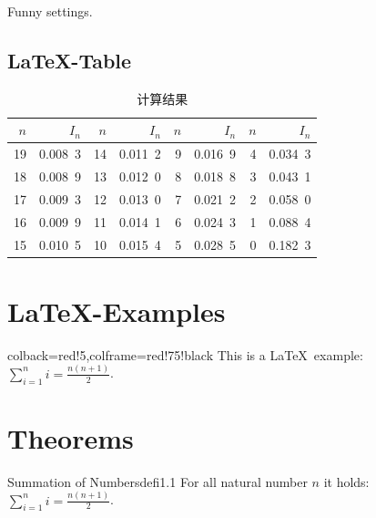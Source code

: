 \begin{tcolorbox}[colback=blue!50,colframe=blue!25!black,coltext=yellow,
    fontupper=\Large\bfseries,arc=6mm,boxrule=2mm,boxsep=5mm]
  Funny settings.
\end{tcolorbox}

\subsection{\LaTeX-Table}

\begin{table}[h]\begin{center}\color{darkblue}\caption{计算结果}\color{black}\label{tab1-2}
{\footnotesize
\begin{tabular}{r|r||r|r||r|r||r|r}\arrayrulecolor{darkblue}\hline\rowcolor{lightblue}
  $n$&$I_n$&$n$&$I_n$&$n$&$I_n$&$n$&$I_n$\\\hline
  19&0.008\ 3&14&0.011\ 2&9&0.016\ 9&4&0.034\ 3\\
  18&0.008\ 9&13&0.012\ 0&8&0.018\ 8&3&0.043\ 1\\
  17&0.009\ 3&12&0.013\ 0&7&0.021\ 2&2&0.058\ 0\\
  16&0.009\ 9&11&0.014\ 1&6&0.024\ 3&1&0.088\ 4\\
  15&0.010\ 5&10&0.015\ 4&5&0.028\ 5&0&0.182\ 3\\\hline
 \end{tabular}}\end{center}\end{table}


\section{\LaTeX-Examples}

\begin{tcblisting}{colback=red!5,colframe=red!75!black}
This is a \LaTeX\ example:
$\displaystyle\sum\limits_{i=1}^n i = \frac{n(n+1)}{2}$.
\end{tcblisting}


\section{Theorems}

\begin{defi}{Summation of Numbers}{defi1.1}
  For all natural number $n$ it holds:\\[2mm]
  $\displaystyle\sum\limits_{i=1}^n i = \frac{n(n+1)}{2}$.
\end{defi}

